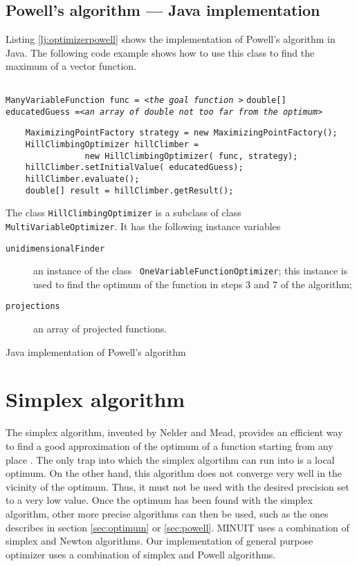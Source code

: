 \documentclass[twoside]{book}
\begin{document}
\subsection{Powell's algorithm --- Java implementation}
 Listing \ref{lj:optimizerpowell}
shows the implementation of Powell's algorithm in Java. The
following code example shows how to use this class to find the
maximum of a vector function.
\begin{codeExample}
\label{ex:jpowell}
\begin{verbatim}
\end{verbatim}
{\tt ManyVariableFunction func = <\sl the goal function\tt
>}\hfil\break
 {\tt double[] educatedGuess =<\sl an array of double not too far from the optimum\tt >}
\begin{verbatim}
    MaximizingPointFactory strategy = new MaximizingPointFactory();
    HillClimbingOptimizer hillClimber =
                new HillClimbingOptimizer( func, strategy);
    hillClimber.setInitialValue( educatedGuess);
    hillClimber.evaluate();
    double[] result = hillClimber.getResult();
\end{verbatim}
\end{codeExample}

The class {\tt HillClimbingOptimizer} is a subclass of class {\tt
MultiVariableOptimizer}. It has the following instance variables
\begin{description}
  \item[\tt unidimensionalFinder] an instance of the class {\tt
  OneVariableFunctionOptimizer}; this instance is used to find the
  optimum of the function in steps 3 and 7 of the algorithm;
  \item[\tt projections] an array of projected functions.
\end{description}

\begin{listing} Java implementation of Powell's algorithm
\label{lj:optimizerpowell}

\end{listing}

\section{Simplex algorithm}
\label{sec:simplex} The simplex algorithm, invented by Nelder and
Mead, provides an efficient way to find a good approximation of
the optimum of a function starting from any place \cite{Press}.
The only trap into which the simplex algortihm can run into is a
local optimum. On the other hand, this algorithm does not converge
very well in the vicinity of the optimum. Thus, it must not be
used with the desired precision set to a very low value. Once the
optimum has been found with the simplex algorithm, other more
precise algorithms can then be used, such as the ones describes in
section \ref{sec:optimum} or \ref{sec:powell}. MINUIT uses a
combination of simplex and Newton algorithms. Our implementation
of general purpose optimizer uses a combination of simplex and
Powell algorithms.
\end{document}
